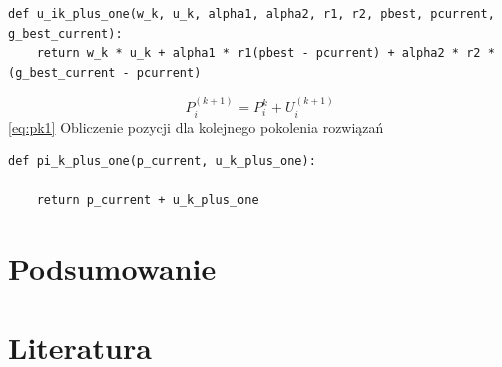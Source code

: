 \documentclass[eng, pl, oneside, openright, final, openbib]{mgr}\DeclareUnicodeCharacter{0301}{\'{e}}
\begin{document}
\begin{lstlisting}
def u_ik_plus_one(w_k, u_k, alpha1, alpha2, r1, r2, pbest, pcurrent, g_best_current):
    return w_k * u_k + alpha1 * r1(pbest - pcurrent) + alpha2 * r2 * (g_best_current - pcurrent)
\end{lstlisting}
\begin{equation}
	P^{(k + 1)}_{i} = P^{k}_{i} + U^{(k + 1)}_{i}
	\label{eq:pk1}
\end{equation}
\ref{eq:pk1} Obliczenie pozycji dla kolejnego pokolenia rozwiązań

\begin{lstlisting}
def pi_k_plus_one(p_current, u_k_plus_one):

    return p_current + u_k_plus_one
\end{lstlisting}

\chapter{Podsumowanie}
\chapter*{Literatura}
\begin{thebibliography}{3}
\end{thebibliography}

\listoftables

\listoffigures
\end{document}
